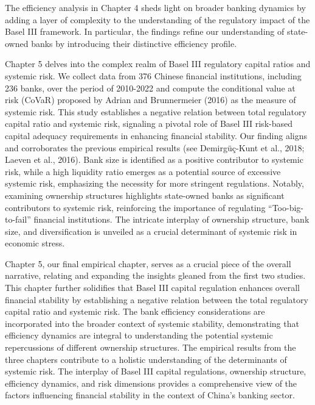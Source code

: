 \documentclass[
  12pt,
  a4paper,
]{scrreprt}
\begin{document}
The efficiency analysis in Chapter 4 sheds light on broader banking
dynamics by adding a layer of complexity to the understanding of the
regulatory impact of the Basel III framework. In particular, the
findings refine our understanding of state-owned banks by introducing
their distinctive efficiency profile.

Chapter 5 delves into the complex realm of Basel III regulatory capital
ratios and systemic risk. We collect data from 376 Chinese financial
institutions, including 236 banks, over the period of 2010-2022 and
compute the conditional value at risk (CoVaR) proposed by Adrian and
Brunnermeier (2016) as the measure of systemic risk. This study
establishes a negative relation between total regulatory capital ratio
and systemic risk, signaling a pivotal role of Basel III risk-based
capital adequacy requirements in enhancing financial stability. Our
finding aligns and corroborates the previous empirical results (see
Demirgüç-Kunt et al., 2018; Laeven et al., 2016). Bank size is
identified as a positive contributor to systemic risk, while a high
liquidity ratio emerges as a potential source of excessive systemic
risk, emphasizing the necessity for more stringent regulations. Notably,
examining ownership structures highlights state-owned banks as
significant contributors to systemic risk, reinforcing the importance of
regulating ``Too-big-to-fail'' financial institutions. The intricate
interplay of ownership structure, bank size, and diversification is
unveiled as a crucial determinant of systemic risk in economic stress.

Chapter 5, our final empirical chapter, serves as a crucial piece of the
overall narrative, relating and expanding the insights gleaned from the
first two studies. This chapter further solidifies that Basel III
capital regulation enhances overall financial stability by establishing
a negative relation between the total regulatory capital ratio and
systemic risk. The bank efficiency considerations are incorporated into
the broader context of systemic stability, demonstrating that efficiency
dynamics are integral to understanding the potential systemic
repercussions of different ownership structures. The empirical results
from the three chapters contribute to a holistic understanding of the
determinants of systemic risk. The interplay of Basel III capital
regulations, ownership structure, efficiency dynamics, and risk
dimensions provides a comprehensive view of the factors influencing
financial stability in the context of China's banking sector.
\end{document}
